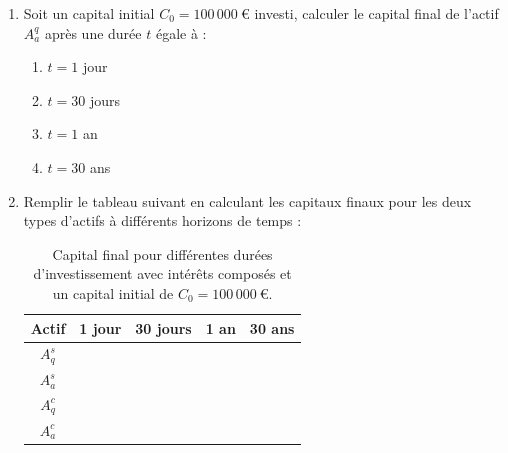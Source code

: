 \documentclass{article}
\begin{document}
\begin{enumerate}[label=\textbf{Q1.\arabic*}]
\begin{enumerate}[label=\textbf{Q2.\arabic*}]
              \item Soit un capital initial \( C_0 = 100\,000\ \text{€} \) investi, calculer le capital final de l'actif \( A_a^q \) après une durée \( t \) égale à :
                    \begin{enumerate}[label=(\alph*)]
                        \item \( t = 1 \) jour
                        \item \( t = 30 \) jours
                        \item \( t = 1 \) an
                        \item \( t = 30 \) ans
                    \end{enumerate}
                    
                    
              \item Remplir le tableau suivant en calculant les capitaux finaux pour les deux types d'actifs à différents horizons de temps :\\
                    \begin{table}[h!]
                        \centering
                        \begin{tabular}{|c|c|c|c|c|}
                            \hline
                            \textbf{Actif} & \textbf{1 jour} & \textbf{30 jours} & \textbf{1 an} & \textbf{30 ans} \\
                            \hline
                            \( A_q^s \)    &                 &                   &               &                 \\
                            \hline
                            \( A_a^s \)    &                 &                   &               &                 \\
                            \hline
                            \( A_q^c \)    &                 &                   &               &                 \\
                            \hline
                            \( A_a^c \)    &                 &                   &               &                 \\
                            \hline
                        \end{tabular}
                        \caption{Capital final pour différentes durées d'investissement avec intérêts composés et un capital initial de \( C_0 = 100\,000\ \text{€} \).}
                        \label{tab:simple_interest_results}
                    \end{table}
                    

\end{enumerate}
\end{enumerate}
\end{document}
